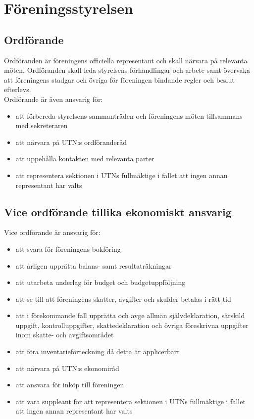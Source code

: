 \documentclass[a4paper]{article}
\begin{document}
\section{Föreningsstyrelsen}
{\subsection{Ordförande}
  Ordföranden är föreningens officiella representant och skall närvara på relevanta möten. Ordföranden skall leda styrelsens förhandlingar och arbete samt övervaka att föreningens stadgar och övriga för föreningen bindande regler och beslut efterlevs.\\
  Ordförande är även ansvarig för:
  \begin{itemize}
    \item att förbereda styrelsens sammanträden och föreningens möten tillsammans med sekreteraren
    \item att närvara på UTN:s ordföranderåd
    \item att uppehålla kontakten med relevanta parter
    \item att representera sektionen i UTNs fullmäktige i fallet att ingen annan representant har valts
  \end{itemize}
  
  \subsection{Vice ordförande tillika ekonomiskt ansvarig}
  Vice ordförande är ansvarig för:
  \begin{itemize}
    \item att svara för föreningens bokföring
    \item att årligen upprätta balans- samt resultaträkningar
    \item att utarbeta underlag för budget och budgetuppföljning
    \item att se till att föreningens skatter, avgifter och skulder betalas i rätt tid
    \item att i förekommande fall upprätta och avge allmän självdeklaration, särskild uppgift, kontrolluppgifter, skattedeklaration och övriga föreskrivna uppgifter inom skatte- och avgiftsområdet
    \item att föra inventarieförteckning då detta är applicerbart
    \item att närvara på UTN:s ekonomiråd
    \item att ansvara för inköp till föreningen
    \item att vara suppleant för att representera sektionen i UTNs fullmäktige i fallet att ingen annan representant har valts
  \end{itemize}
  
}
\end{document}
